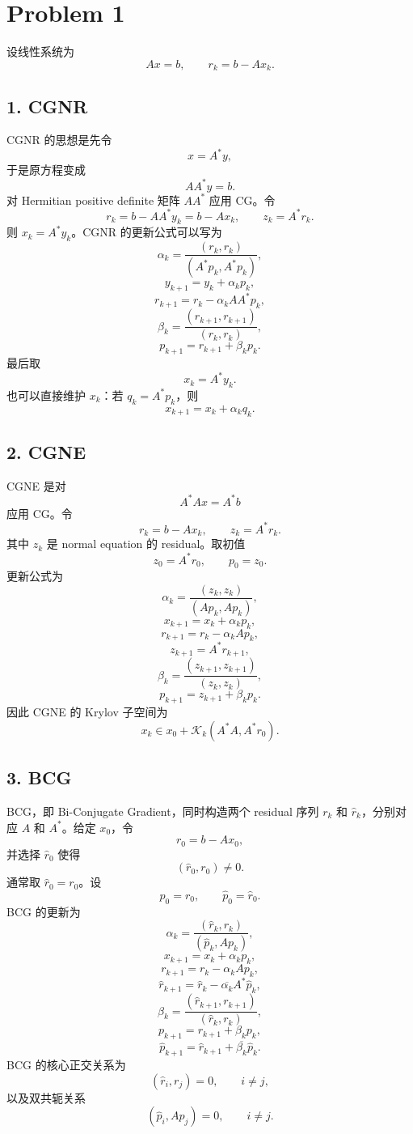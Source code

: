 \documentclass{ctexart}
\newcommand{\K}{\mathcal{K}}
\begin{document}
\section{Problem 1}
\begin{solution}

  设线性系统为
  \[
    Ax=b, \qquad r_k=b-Ax_k.
  \]

  \subsection*{1. CGNR}
  CGNR 的思想是先令
  \[
    x=A^*y,
  \]
  于是原方程变成
  \[
    AA^*y=b.
  \]
  对 Hermitian positive definite 矩阵 $AA^*$ 应用 CG。令
  \[
    r_k=b-AA^*y_k=b-Ax_k, \qquad z_k=A^*r_k.
  \]
  则 $x_k=A^*y_k$。CGNR 的更新公式可以写为
  \[
    \alpha_k=\frac{(r_k,r_k)}{(A^*p_k,A^*p_k)},
  \]
  \[
    y_{k+1}=y_k+\alpha_k p_k,
  \]
  \[
    r_{k+1}=r_k-\alpha_k AA^*p_k,
  \]
  \[
    \beta_k=\frac{(r_{k+1},r_{k+1})}{(r_k,r_k)},
  \]
  \[
    p_{k+1}=r_{k+1}+\beta_k p_k.
  \]
  最后取
  \[
    x_k=A^*y_k.
  \]
  也可以直接维护 $x_k$：若 $q_k=A^*p_k$，则
  \[
    x_{k+1}=x_k+\alpha_k q_k.
  \]

  \subsection*{2. CGNE}
  CGNE 是对
  \[
    A^*Ax=A^*b
  \]
  应用 CG。令
  \[
    r_k=b-Ax_k, \qquad z_k=A^*r_k.
  \]
  其中 $z_k$ 是 normal equation 的 residual。取初值
  \[
    z_0=A^*r_0, \qquad p_0=z_0.
  \]
  更新公式为
  \[
    \alpha_k=\frac{(z_k,z_k)}{(Ap_k,Ap_k)},
  \]
  \[
    x_{k+1}=x_k+\alpha_k p_k,
  \]
  \[
    r_{k+1}=r_k-\alpha_k Ap_k,
  \]
  \[
    z_{k+1}=A^*r_{k+1},
  \]
  \[
    \beta_k=\frac{(z_{k+1},z_{k+1})}{(z_k,z_k)},
  \]
  \[
    p_{k+1}=z_{k+1}+\beta_kp_k.
  \]
  因此 CGNE 的 Krylov 子空间为
  \[
    x_k\in x_0+\K_k(A^*A,A^*r_0).
  \]

  \subsection*{3. BCG}
  BCG，即 Bi-Conjugate Gradient，同时构造两个 residual 序列 $r_k$ 和 $\hat r_k$，分别对应 $A$ 和 $A^*$。给定 $x_0$，令
  \[
    r_0=b-Ax_0,
  \]
  并选择 $\hat r_0$ 使得
  \[
    (\hat r_0,r_0)\ne 0.
  \]
  通常取 $\hat r_0=r_0$。设
  \[
    p_0=r_0, \qquad \hat p_0=\hat r_0.
  \]
  BCG 的更新为
  \[
    \alpha_k=\frac{(\hat r_k,r_k)}{(\hat p_k,Ap_k)},
  \]
  \[
    x_{k+1}=x_k+\alpha_kp_k,
  \]
  \[
    r_{k+1}=r_k-\alpha_kAp_k,
  \]
  \[
    \hat r_{k+1}=\hat r_k-\overline{\alpha_k}A^*\hat p_k,
  \]
  \[
    \beta_k=\frac{(\hat r_{k+1},r_{k+1})}{(\hat r_k,r_k)},
  \]
  \[
    p_{k+1}=r_{k+1}+\beta_kp_k,
  \]
  \[
    \hat p_{k+1}=\hat r_{k+1}+\overline{\beta_k}\hat p_k.
  \]
  BCG 的核心正交关系为
  \[
    (\hat r_i,r_j)=0, \qquad i\ne j,
  \]
  以及双共轭关系
  \[
    (\hat p_i,Ap_j)=0, \qquad i\ne j.
  \]

\end{solution}
\end{document}

